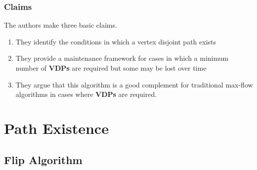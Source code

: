 \documentclass{beamer}
\begin{document}
\begin{frame}
  \frametitle{Claims}
  The authors make three basic claims.
  \begin{enumerate}
  \item They identify the conditions in which a vertex disjoint path exists
  \item They provide a maintenance framework for cases in which a minimum number of {\bf VDPs} are required but some may be lost over time
  \item They argue that this algorithm is a good complement for traditional max-flow algorithms in cases where {\bf VDPs} are required.
  \end{enumerate}
\end{frame}

\section{Path Existence}
\subsection{Flip Algorithm}
\end{document}
